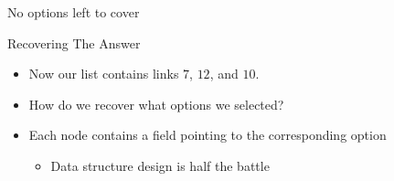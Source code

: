 \documentclass[aspectratio=169]{beamer}
\begin{document}
{ 
\begin{frame}{}
    \vspace{-130pt}
    No options left to cover
\end{frame} 
}

\begin{frame}{Recovering The Answer}
    \begin{itemize}
        \item Now our list contains links {\color{sigma@mainblue}$7$}, {\color{sigma@mainblue}$12$}, and {\color{sigma@mainblue}$10$}.
        \item How do we recover what options we selected? \pause
        \item Each node contains a field pointing to the corresponding option
        \begin{itemize}
            \item Data structure design is half the battle
        \end{itemize}
    \end{itemize}
\end{frame}
\end{document}
